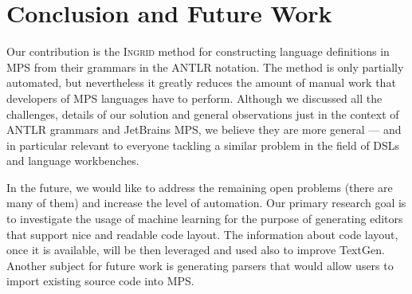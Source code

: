 \section{Conclusion and Future Work}

Our contribution is the \textsc{Ingrid} method for constructing language definitions in MPS from their grammars in the ANTLR notation.
The method is only partially automated, but nevertheless it greatly reduces the amount of manual work that developers of MPS languages have to perform.
Although we discussed all the challenges, details of our solution and general observations just in the context of ANTLR grammars and JetBrains MPS, we believe they are more general --- and in particular relevant to everyone tackling a similar problem in the field of DSLs and language workbenches.

In the future, we would like to address the remaining open problems (there are many of them) and increase the level of automation.
Our primary research goal is to investigate the usage of machine learning for the purpose of generating editors that support nice and readable code layout.
The information about code layout, once it is available, will be then leveraged and used also to improve TextGen.
Another subject for future work is generating parsers that would allow users to import existing source code into MPS.

